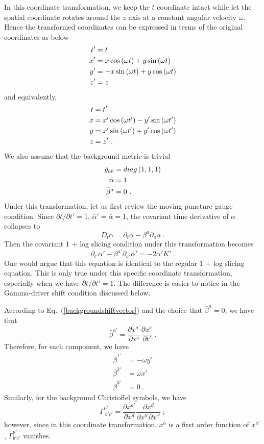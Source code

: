 In this coordinate transformation, we keep the $t$ coordinate intact while let the spatial coordinate rotates around the $z$ axis at a constant angular velocity $\omega$. Hence the transformed coordinates can be expressed in terms of the original coordinates as below
\begin{align}
t' & = t\notag\\
x' & = x \cos\left(\omega t\right) + y\sin\left(\omega t\right)\notag\\
y' & = -x\sin\left(\omega t\right) + y\cos\left(\omega t\right)\notag\\
z' & = z
\end{align}
and equivalently, 
\begin{align}
t & = t'\notag\\
x & = x'\cos\left(\omega t'\right) - y'\sin\left(\omega t'\right)\notag\\
y & = x'\sin\left(\omega t'\right) + y'\cos\left(\omega t'\right)\notag\\
z & = z' \ .
\end{align}
We also assume that the background metric is trivial
\begin{align}
{\bar g}_{ab} & = diag\left(1,1,1\right)\notag\\
{\bar \alpha} & = 1\notag\\
{\bar \beta}^{a} & = 0 \ . 
\end{align}
Under this transformation, let us first review the moving puncture gauge condition. Since $\partial t/\partial t' = 1$, ${\bar \alpha}' = {\bar \alpha} = 1$, the covariant time derivative of $\alpha$ collapses to
\begin{equation}
D_{t}\alpha = \partial_{t}\alpha - \beta^{a}\partial_{a}\alpha \ .
\end{equation}
Then the covariant 1 + log slicing condition under this transformation becomes
\begin{equation}\label{transformed 1 + log slicing}
\partial_{t'}\alpha' - \beta^{a'}\partial_{a'}\alpha' = -2\alpha'K' \ .
\end{equation}
One would argue that this equation is identical to the regular 1 + log slicing equation. This is only true under this specific coordinate transformation, especially when we have $\partial t/\partial t' = 1$. The difference is easier to notice in the Gamma-driver shift condition discussed below. 

According to Eq.~(\ref{backgroundshiftvector}) and the choice that ${\bar \beta}^{a} = 0$, we have that
\[
{\bar \beta}^{a'} = \frac{\partial x^{a'}}{\partial x^{a}}\frac{\partial x^{a}}{\partial t'} \ .
\]
Therefore, for each component, we have
\begin{align*}
{\bar \beta}^{1'} & = -\omega y'\\
{\bar \beta}^{2'} & = \omega x'\\
{\bar \beta}^{3'} & = 0 \ .
\end{align*}
Similarly, for the background Christoffel symbols, we have
\[
{\bar \Gamma}^{a'}_{~b'c'} = \frac{\partial x^{a'}}{\partial x^{d}}\frac{\partial x^{d}}{\partial x^{b'}\partial x^{c'}} \ ;
\]
however, since in this coordinate transformation, $x^{a}$ is a first order function of $x^{a'}$, ${\bar \Gamma}^{a'}_{b'c'}$ vanishes. 

